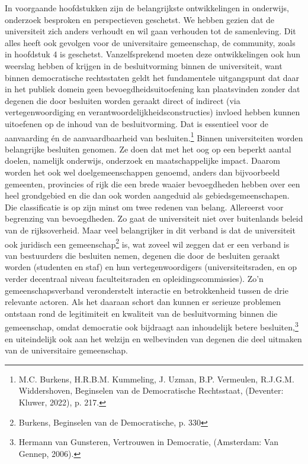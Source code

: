 \documentclass{jote-book}
\begin{document}
	In voorgaande hoofdstukken zijn de belangrijkste ontwikkelingen in onderwijs, onderzoek besproken en perspectieven geschetst. We hebben gezien dat de universiteit zich anders verhoudt en wil gaan verhouden tot de samenleving. Dit alles heeft ook gevolgen voor de universitaire gemeenschap, de community, zoals in hoofdstuk 4 is geschetst. Vanzelfsprekend moeten deze ontwikkelingen ook hun weerslag hebben of krijgen in de besluitvorming binnen de universiteit, want binnen democratische rechtsstaten geldt het fundamentele uitgangspunt dat daar in het publiek domein geen bevoegdheidsuitoefening kan plaatsvinden zonder dat degenen die door besluiten worden geraakt direct of indirect (via vertegenwoordiging en verantwoordelijkheidsconstructies) invloed hebben kunnen uitoefenen op de inhoud van de besluitvorming. Dat is essentieel voor de aanvaarding én de aanvaardbaarheid van besluiten.\footnote{M.C. Burkens, H.R.B.M. Kummeling, J. Uzman, B.P. Vermeulen, R.J.G.M. Widdershoven, Beginselen van de Democratische Rechtsstaat, (Deventer: Kluwer, 2022), p. 217.} Binnen universiteiten worden belangrijke besluiten genomen. Ze doen dat met het oog op een beperkt aantal doelen, namelijk onderwijs, onderzoek en maatschappelijke impact. Daarom worden het ook wel doelgemeenschappen genoemd, anders dan bijvoorbeeld gemeenten, provincies of rijk die een brede waaier bevoegdheden hebben over een heel grondgebied en die dan ook worden aangeduid als gebiedsgemeenschapen. Die classificatie is op zijn minst om twee redenen van belang. Allereerst voor begrenzing van bevoegdheden. Zo gaat de universiteit niet over buitenlands beleid van de rijksoverheid. Maar veel belangrijker in dit verband is dat de universiteit ook juridisch een gemeenschap\footnote{Burkens, Beginselen van de Democratische, p. 330} is, wat zoveel wil zeggen dat er een verband is van bestuurders die besluiten nemen, degenen die door de besluiten geraakt worden (studenten en staf) en hun vertegenwoordigers (universiteitsraden, en op verder decentraal niveau faculteitsraden en opleidingscommissies). Zo'n gemeenschapsverband veronderstelt interactie en betrokkenheid tussen de drie relevante actoren. Als het daaraan schort dan kunnen er serieuze problemen ontstaan rond de legitimiteit en kwaliteit van de besluitvorming binnen die gemeenschap, omdat democratie ook bijdraagt aan inhoudelijk betere besluiten,\footnote{Hermann van Gunsteren, Vertrouwen in Democratie, (Amsterdam: Van Gennep, 2006).} en uiteindelijk ook aan het welzijn en welbevinden van degenen die deel uitmaken van de universitaire gemeenschap.
\end{document}

